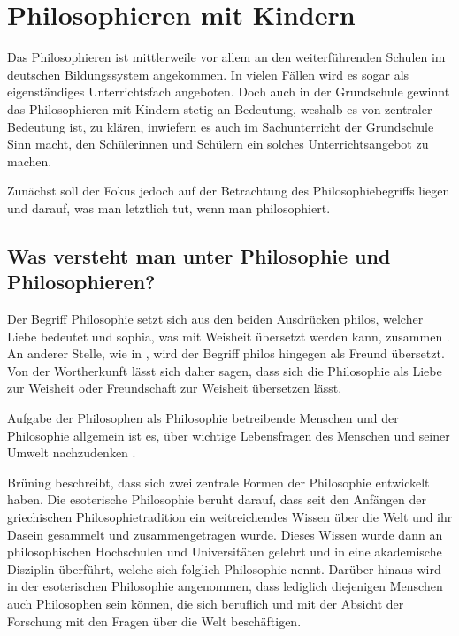 \section{Philosophieren mit Kindern}

Das Philosophieren ist mittlerweile vor allem an den weiterführenden Schulen im deutschen Bildungssystem angekommen.
 In vielen Fällen wird es sogar als eigenständiges Unterrichtsfach angeboten. 
 Doch auch in der Grundschule gewinnt das Philosophieren mit Kindern stetig an Bedeutung, weshalb es von zentraler Bedeutung ist, zu klären, inwiefern es auch im Sachunterricht der 
 Grundschule Sinn macht, den Schülerinnen und Schülern ein solches Unterrichtsangebot zu machen. 
 
Zunächst soll der Fokus jedoch auf der Betrachtung des Philosophiebegriffs liegen und darauf, was man letztlich tut, wenn man philosophiert.



\subsection{Was versteht man unter Philosophie und Philosophieren?}

Der Begriff \glqq Philosophie\grqq{} setzt sich aus den beiden Ausdrücken \glqq philos\grqq{}, welcher Liebe bedeutet und \glqq sophia\grqq{}, was mit Weisheit übersetzt werden kann, zusammen \cite[S.\,8]{BB10}. 
An anderer Stelle, wie in \cite{GT16}, wird der Begriff \glqq philos\grqq{} hingegen als \glqq Freund\grqq{} übersetzt. 
Von der Wortherkunft lässt sich daher sagen, dass sich die Philosophie als \glqq Liebe zur Weisheit\grqq{} oder \glqq Freundschaft zur Weisheit\grqq{} übersetzen lässt. 

Aufgabe der Philosophen als Philosophie betreibende Menschen und der Philosophie allgemein ist es, \glqq über wichtige Lebensfragen\grqq{} des Menschen und seiner Umwelt nachzudenken \cite[S.\,8]{BB10}. 

Brüning beschreibt, dass sich zwei zentrale Formen der Philosophie entwickelt haben. 
Die esoterische Philosophie beruht darauf, dass seit den Anfängen der griechischen Philosophietradition ein weitreichendes Wissen über die Welt und ihr Dasein gesammelt und zusammengetragen wurde. 
Dieses Wissen wurde dann an philosophischen Hochschulen und Universitäten gelehrt und in eine akademische Disziplin überführt, welche sich folglich Philosophie nennt. 
Darüber hinaus wird in der esoterischen Philosophie angenommen, dass lediglich diejenigen Menschen auch Philosophen sein können, die sich beruflich und mit der Absicht der Forschung mit den Fragen über die Welt beschäftigen.

